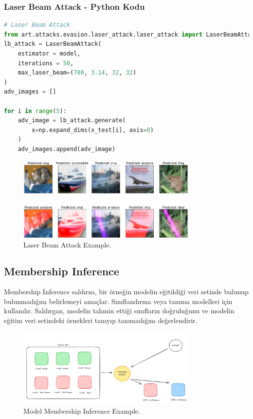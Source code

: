 \newpage

\subsubsection{Laser Beam Attack - Python Kodu}

\begin{lstlisting}[language=Python]
# Laser Beam Attack
from art.attacks.evasion.laser_attack.laser_attack import LaserBeamAttack
lb_attack = LaserBeamAttack(
    estimator = model,
    iterations = 50,
    max_laser_beam=(780, 3.14, 32, 32)
)
adv_images = []

for i in range(5):
    adv_image = lb_attack.generate(
        x=np.expand_dims(x_test[i], axis=0)
    )
    adv_images.append(adv_image)
\end{lstlisting}

\begin{figure}[h]
  \centering
  \includegraphics[width=0.8\textwidth]{images/evasion_laser_beam.png}
  \caption{Laser Beam Attack Example.}
\end{figure}

\newpage

\subsection{Membership Inference}
Membership Inference saldırısı, bir örneğin modelin eğitildiği veri setinde bulunup bulunmadığını belirlemeyi amaçlar. Sınıflandırma veya tanıma modelleri için kullanılır. Saldırgan, modelin tahmin ettiği sınıfların doğruluğunu ve modelin eğitim veri setindeki örnekleri tanıyıp tanımadığını değerlendirir.

\begin{figure}[h]
  \centering
  \includegraphics[width=0.8\textwidth]{images/ai_sec_membership_inference.png}
  \caption{Model Membership Inference Example.}
\end{figure}

